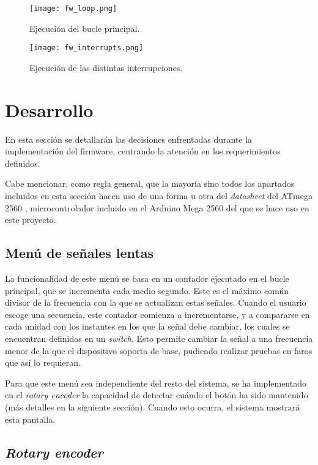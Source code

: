 \begin{figure}[h!]
    \centering
    \texttt{[image: fw\_loop.png]}
    \caption{Ejecución del bucle principal.}
    \label{fig:fw_loop}
\end{figure}

\begin{figure}[h!]
    \centering
    \texttt{[image: fw\_interrupts.png]}
    \caption{Ejecución de las distintas interrupciones.}
    \label{fig:fw_interrupts}
\end{figure}

\section{Desarrollo}

En esta sección se detallarán las decisiones enfrentadas durante la implementación del firmware, centrando la atención en los requerimientos definidos.

Cabe mencionar, como regla general, que la mayoría sino todos los apartados incluidos en esta sección hacen uso de una forma u otra del \textit{datasheet} del ATmega 2560 \cite{atmega2560}, microcontrolador incluido en el Arduino Mega 2560 del que se hace uso en este proyecto.

\subsection{Menú de señales lentas}

La funcionalidad de este menú se basa en un contador ejecutado en el bucle principal, que se incrementa cada medio segundo. Este es el máximo común divisor de la frecuencia con la que se actualizan estas señales. Cuando el usuario escoge una secuencia, este contador comienza a incrementarse, y a compararse en cada unidad con los instantes en los que la señal debe cambiar, los cuales se encuentran definidos en un \textit{switch}. Esto permite cambiar la señal a una frecuencia menor de la que el dispositivo soporta de base, pudiendo realizar pruebas en faros que así lo requieran.

Para que este menú sea independiente del resto del sistema, se ha implementado en el \textit{rotary encoder} la capacidad de detectar cuándo el botón ha sido mantenido (más detalles en la siguiente sección). Cuando esto ocurra, el sistema mostrará esta pantalla.

\subsection{\textit{Rotary encoder}}

